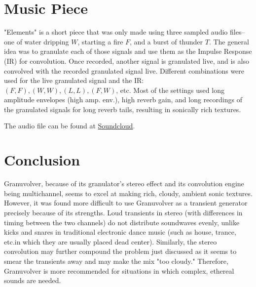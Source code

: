 \documentclass{article}
\begin{document}
	\section{Music Piece}
		"Elements" is a short piece that was only made using three sampled audio files--one of water dripping $W$, starting a fire $F$, and a burst of thunder $T$. The general idea was to granulate each of those signals and use them as the Impulse Response (IR) for convolution. Once recorded, another signal is granulated live, and is also convolved with the recorded granulated signal live. Different combinations were used for the live granulated signal and the IR: $(F,F), (W,W), (L,L), (F,W)$, etc. Most of the settings used long amplitude envelopes (high amp. env.), high reverb gain, and long recordings of the granulated signals for long reverb tails, resulting in sonically rich textures.

		The audio file can be found at \href{https://soundcloud.com/edderic/elements}{Soundcloud}.

	\section{Conclusion}
		Granuvolver, because of its granulator's stereo effect and its convolution engine being multichannel, seems to excel at making rich, cloudy, ambient sonic textures. However, it was found more difficult to use Granuvolver as a transient generator precisely because of its strengths. Loud transients in stereo (with differences in timing between the two channels) do not distribute soundwaves evenly, unlike kicks and snares in traditional electronic dance music (such as house, trance, etc.in which they are usually placed dead center).  Similarly, the stereo convolution may further compound the problem just discussed as it seems to smear the transients away and may make the mix "too cloudy."  Therefore, Granuvolver is more recommended for situations in which complex, ethereal sounds are needed.
\end{document}
